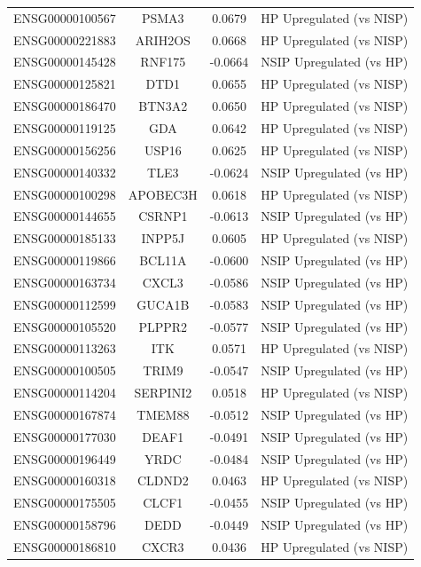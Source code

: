 \documentclass[
]{article}
\begin{document}
\begin{singlespace}
\begin{longtable}[t]{lccc}
\addlinespace
ENSG00000100567 & PSMA3 & 0.0679 & HP Upregulated (vs NISP)\\
ENSG00000221883 & ARIH2OS & 0.0668 & HP Upregulated (vs NISP)\\
ENSG00000145428 & RNF175 & -0.0664 & NSIP Upregulated (vs HP)\\
ENSG00000125821 & DTD1 & 0.0655 & HP Upregulated (vs NISP)\\
ENSG00000186470 & BTN3A2 & 0.0650 & HP Upregulated (vs NISP)\\
\addlinespace
ENSG00000119125 & GDA & 0.0642 & HP Upregulated (vs NISP)\\
ENSG00000156256 & USP16 & 0.0625 & HP Upregulated (vs NISP)\\
ENSG00000140332 & TLE3 & -0.0624 & NSIP Upregulated (vs HP)\\
ENSG00000100298 & APOBEC3H & 0.0618 & HP Upregulated (vs NISP)\\
ENSG00000144655 & CSRNP1 & -0.0613 & NSIP Upregulated (vs HP)\\
\addlinespace
ENSG00000185133 & INPP5J & 0.0605 & HP Upregulated (vs NISP)\\
ENSG00000119866 & BCL11A & -0.0600 & NSIP Upregulated (vs HP)\\
ENSG00000163734 & CXCL3 & -0.0586 & NSIP Upregulated (vs HP)\\
ENSG00000112599 & GUCA1B & -0.0583 & NSIP Upregulated (vs HP)\\
ENSG00000105520 & PLPPR2 & -0.0577 & NSIP Upregulated (vs HP)\\
\addlinespace
ENSG00000113263 & ITK & 0.0571 & HP Upregulated (vs NISP)\\
ENSG00000100505 & TRIM9 & -0.0547 & NSIP Upregulated (vs HP)\\
ENSG00000114204 & SERPINI2 & 0.0518 & HP Upregulated (vs NISP)\\
ENSG00000167874 & TMEM88 & -0.0512 & NSIP Upregulated (vs HP)\\
ENSG00000177030 & DEAF1 & -0.0491 & NSIP Upregulated (vs HP)\\
\addlinespace
ENSG00000196449 & YRDC & -0.0484 & NSIP Upregulated (vs HP)\\
ENSG00000160318 & CLDND2 & 0.0463 & HP Upregulated (vs NISP)\\
ENSG00000175505 & CLCF1 & -0.0455 & NSIP Upregulated (vs HP)\\
ENSG00000158796 & DEDD & -0.0449 & NSIP Upregulated (vs HP)\\
ENSG00000186810 & CXCR3 & 0.0436 & HP Upregulated (vs NISP)\\

\end{longtable}
\end{singlespace}
\end{document}

